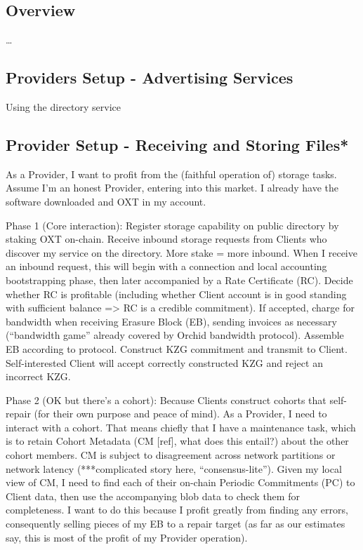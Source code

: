 \documentclass{article}
\begin{document}
\subsection{Overview}
…
\subsection{Providers Setup - Advertising Services}
Using the directory service

\subsection{Provider Setup - Receiving and Storing Files*}
As a Provider, I want to profit from the (faithful operation of) storage tasks. Assume I’m an honest Provider, entering into this market. I already have the software downloaded and OXT in my account.

Phase 1 (Core interaction):
Register storage capability on public directory by staking OXT on-chain. Receive inbound storage requests from Clients who discover my service on the directory. More stake = more inbound. When I receive an inbound request, this will begin with a connection and local accounting bootstrapping phase, then later accompanied by a Rate Certificate (RC).
Decide whether RC is profitable (including whether Client account is in good standing with sufficient balance => RC is a credible commitment). If accepted, charge for bandwidth when receiving Erasure Block (EB), sending invoices as necessary (“bandwidth game” already covered by Orchid bandwidth protocol). Assemble EB according to protocol. Construct KZG commitment and transmit to Client. Self-interested Client will accept correctly constructed KZG and reject an incorrect KZG.

Phase 2 (OK but there’s a cohort):
Because Clients construct cohorts that self-repair (for their own purpose and peace of mind). As a Provider, I need to interact with a cohort. That means chiefly that I have a maintenance task, which is to retain Cohort Metadata (CM [ref], what does this entail?) about the other cohort members. CM is subject to disagreement across network partitions or network latency (***complicated story here, “consensus-lite”). Given my local view of CM, I need to find each of their on-chain Periodic Commitments (PC) to Client data, then use the accompanying blob data to check them for completeness. I want to do this because I profit greatly from finding any errors, consequently selling pieces of my EB to a repair target (as far as our estimates say, this is most of the profit of my Provider operation).
\end{document}
